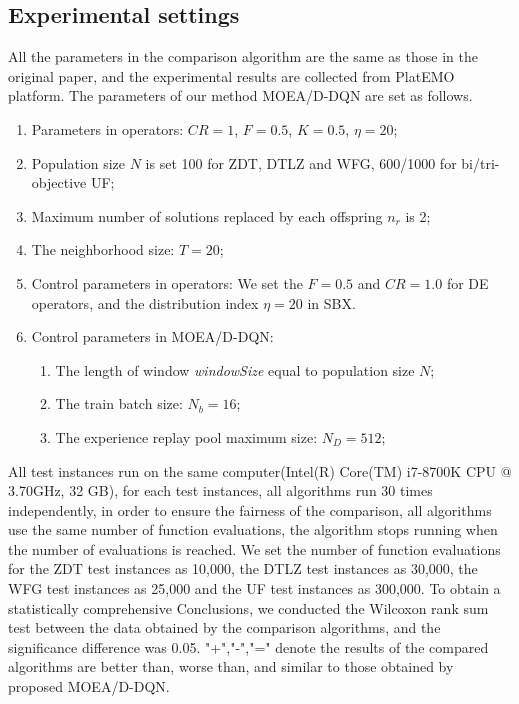 \documentclass[journal]{IEEEtran}
\begin{document}
\subsection{Experimental settings}
All the parameters in the comparison algorithm are the same as those in the original paper, and the experimental results are collected from PlatEMO \cite{PlatEMO} platform.
The parameters of our method MOEA/D-DQN are set as follows.
\begin{enumerate}
  \item Parameters in operators: $CR=1$, $F=0.5$, $K=0.5$, $\eta=20$;
  \item Population size $N$ is set 100 for ZDT, DTLZ and WFG, 600/1000 for bi/tri-objective UF;
  \item Maximum number of solutions replaced by each offspring $n_r$ is 2;
  \item The neighborhood size: $T=20$;
  \item Control parameters in operators: We set the $F=0.5$ and $CR=1.0$ for DE operators, and the distribution index $\eta=20$ in SBX.
  \item Control parameters in MOEA/D-DQN:
        \begin{enumerate}
          \item The length of window \textit{windowSize} equal to population size $N$;
          \item The train batch size: $N_b = 16$;
          \item The experience replay pool maximum size: $N_D=512$;
        \end{enumerate}
\end{enumerate}

All test instances run on the same computer(Intel(R) Core(TM) i7-8700K CPU @ 3.70GHz, 32 GB), for each test instances, all algorithms run 30 times independently, in order to ensure the fairness of the comparison, all algorithms use the same number of function evaluations,
the algorithm stops running when the number of evaluations is reached.
We set the number of function evaluations for the ZDT test instances as 10,000, the DTLZ test instances as 30,000, the WFG test instances as 25,000 and the UF test instances as 300,000.
To obtain a statistically comprehensive Conclusions, we conducted the Wilcoxon rank sum test between the data obtained by the comparison algorithms, and the significance difference was 0.05.
"+","-","=" denote the results of the compared algorithms are better than, worse than, and similar to those obtained by proposed MOEA/D-DQN.
\end{document}
